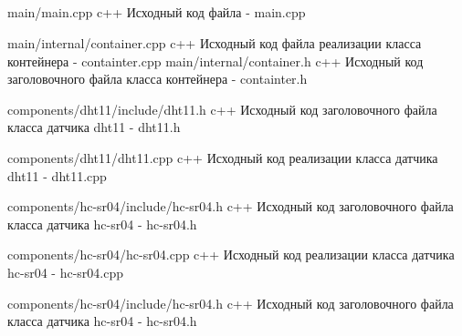 \documentclass{bmstu}
\begin{document}
    \begin{appendices}
        \chapter{}
        {main/main.cpp} %
        {c++}
        {Исходный код файла - main.cpp} %

        {main/internal/container.cpp} %
        {c++}
        {Исходный код файла реализации класса контейнера  - containter.cpp} %
        {main/internal/container.h} %
        {c++}
        {Исходный код заголовочного файла класса контейнера - containter.h} %

        {components/dht11/include/dht11.h} %
        {c++}
        {Исходный код заголовочного файла класса датчика dht11 - dht11.h} %

        {components/dht11/dht11.cpp} %
        {c++}
        {Исходный код реализации класса датчика dht11 - dht11.cpp} %

        {components/hc-sr04/include/hc-sr04.h} %
        {c++}
        {Исходный код заголовочного файла класса датчика hc-sr04 - hc-sr04.h} %

        {components/hc-sr04/hc-sr04.cpp} %
        {c++}
        {Исходный код реализации класса датчика hc-sr04 - hc-sr04.cpp} %

        {components/hc-sr04/include/hc-sr04.h} %
        {c++}
        {Исходный код заголовочного файла класса датчика hc-sr04 - hc-sr04.h} %


\end{appendices}
\end{document}
